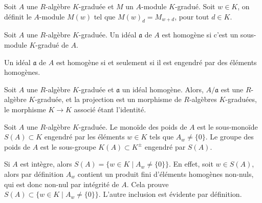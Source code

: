 \begin{ex}\label{GradedTwistedModule}
Soit $A$ une $R$-algèbre $K$-graduée et $M$ un $A$-module $K$-gradué. Soit $w\in K$, on définit le $A$-module $M(w)$ tel que $M(w)_d=M_{w+d}$, pour tout $d\in K$.
\end{ex}

\begin{defn}
Soit $A$ une $R$-algèbre $K$-graduée. Un idéal $\mathfrak{a}$ de $A$ est homogène si c'est un sous-module $K$-gradué de $A$.
\end{defn}

\begin{prop}
Un idéal $\mathfrak{a}$ de $A$ est homogène si et seulement si il est engendré par des éléments homogènes.
\end{prop}

\begin{rem}
Soit $A$ une $R$-algèbre $K$-graduée et $\mathfrak{a}$ un idéal homogène. Alors, $A/\mathfrak{a}$ est une $R$-algèbre $K$-graduée, et la projection est un morphisme de $R$-algèbres $K$-graduées, le morphisme $K\rightarrow K$ associé étant l'identité.
\end{rem}

\begin{defn}
Soit $A$ une $R$-algèbre $K$-graduée. Le monoïde des poids de $A$ est le sous-monoïde $S(A)\subset K$ engendré par les éléments $w\in K$ tels que $A_w\neq \lbrace 0 \rbrace$. Le groupe des poids de $A$ est le sous-groupe $K(A)\subset K^{\pm}$ engendré par $S(A)$.
\end{defn}

\begin{rem}
Si $A$ est intègre, alors $S(A)=\lbrace w\in K\mid A_w\neq \lbrace 0\rbrace\rbrace$. En effet, soit $w\in S(A)$, alors par définition $A_w$ contient un produit fini d'éléments homogènes non-nuls, qui est donc non-nul par intégrité de $A$. Cela prouve $S(A)\subset\lbrace w\in K\mid A_w\neq \lbrace 0\rbrace\rbrace$. L'autre inclusion est évidente par définition.
\end{rem}

